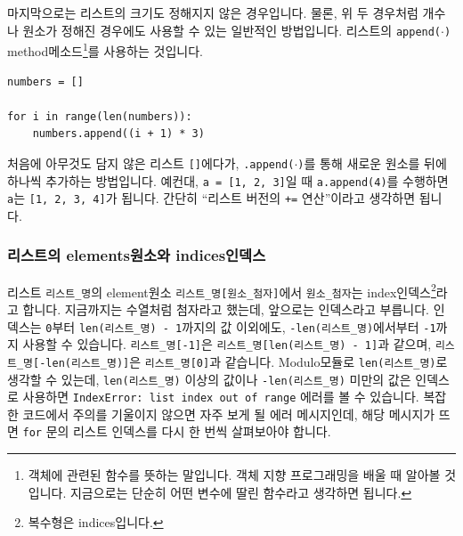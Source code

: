\documentclass[../main.tex]{subfiles}
\begin{document}
마지막으로는 리스트의 크기도 정해지지 않은 경우입니다.
물론, 위 두 경우처럼 개수나 원소가 정해진 경우에도 사용할 수 있는 일반적인 방법입니다.
리스트의 \texttt{append($\cdot$)} method메소드\footnote{객체에 관련된 함수를 뜻하는 말입니다. 객체 지향 프로그래밍을 배울 때 알아볼 것입니다. 지금으로는 단순히 어떤 변수에 딸린 함수라고 생각하면 됩니다.}를 사용하는 것입니다.
\begin{verbatim}
numbers = []

for i in range(len(numbers)):
    numbers.append((i + 1) * 3)
\end{verbatim}
처음에 아무것도 담지 않은 리스트 \texttt{[]}에다가, \texttt{.append($\cdot$)}를 통해 새로운 원소를 뒤에 하나씩 추가하는 방법입니다.
예컨대, \texttt{a = [1, 2, 3]}일 때 \texttt{a.append(4)}를 수행하면 \texttt{a}는 \texttt{[1, 2, 3, 4]}가 됩니다.
간단히 ``리스트 버전의 \texttt{+=} 연산''이라고 생각하면 됩니다.

\subsubsection{리스트의 elements원소와 indices인덱스}
리스트 \texttt{리스트\_명}의 element원소 \texttt{리스트\_명[원소\_첨자]}에서 \texttt{원소\_첨자}는 index인덱스\footnote{복수형은 indices입니다.}라고 합니다.
지금까지는 수열처럼 첨자라고 했는데, 앞으로는 인덱스라고 부릅니다.
인덱스는 \texttt{0}부터 \texttt{len(리스트\_명) - 1}까지의 값 이외에도, \texttt{-len(리스트\_명)}에서부터 \texttt{-1}까지 사용할 수 있습니다.
\texttt{리스트\_명[-1]}은 \texttt{리스트\_명[len(리스트\_명) - 1]}과 같으며, \texttt{리스트\_명[-len(리스트\_명)]}은 \texttt{리스트\_명[0]}과 같습니다.
Modulo모듈로 \texttt{len(리스트\_명)}로 생각할 수 있는데, \texttt{len(리스트\_명)} 이상의 값이나 \texttt{-len(리스트\_명)} 미만의 값은 인덱스로 사용하면 \texttt{IndexError: list index out of range} 에러를 볼 수 있습니다.
복잡한 코드에서 주의를 기울이지 않으면 자주 보게 될 에러 메시지인데, 해당 메시지가 뜨면 \texttt{for} 문의 리스트 인덱스를 다시 한 번씩 살펴보아야 합니다.
\end{document}
